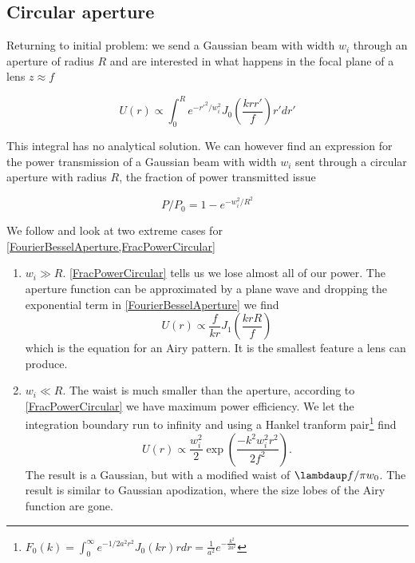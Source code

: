 \subsection{Circular aperture}

Returning to initial problem: we send a Gaussian beam with width $w_i$ through an aperture of radius $R$ and are interested in what happens in the focal plane of a lens $z\approx f$

\begin{equation}\label{FourierBesselAperture}
    U(r) \propto \int_0^R e^{-r'^2/w_i^2} J_0\left(\frac{k r r'}{f}\right)r'dr'
\end{equation}

This integral has no analytical solution. We can however find an expression for the power transmission of a Gaussian beam with width $w_i$ sent through a circular aperture with radius $R$, the fraction of power transmitted issue

\begin{equation}\label{FracPowerCircular}
    P/P_0 = 1 - e^{-w_i^2/R^2}
\end{equation}

We follow \cite{Madjarov2021} and look at two extreme cases for \cref{FourierBesselAperture,FracPowerCircular}

\begin{enumerate}
    \item $w_i \gg R$. \cref{FracPowerCircular} tells us we lose almost all of our power. The aperture function can be approximated by a plane wave and dropping the exponential term in \cref{FourierBesselAperture} we find
    \begin{equation}\label{Airy}
        U(r) \propto \frac{f}{k r} J_1\left(\frac{k r R}{f}\right)
    \end{equation}
    which is the equation for an Airy pattern. It is the smallest feature a lens can produce. 

    \item $w_i \ll R$. The waist is much smaller than the aperture, according to \cref{FracPowerCircular} we have maximum power efficiency. We let the integration boundary run to infinity and using a Hankel tranform pair\footnote{$F_0(k) = \int_0^{\infty} e^{-1/2 a^2 r^2} J_0(k r)r dr = \frac{1}{a^2} e^{-\frac{k^2}{2a^2}}$} find 
        \begin{equation}
        U(r) \propto \frac{w_i^2}{2} \exp{\left(\frac{-k^2w_i^2 r^2}{2f^2}\right)}.
    \end{equation}
    The result is a Gaussian, but with a modified waist of $\lambdaup f / \pi w_0$.  The result is similar to Gaussian apodization, where the size lobes of the Airy function are gone. 
\end{enumerate}

